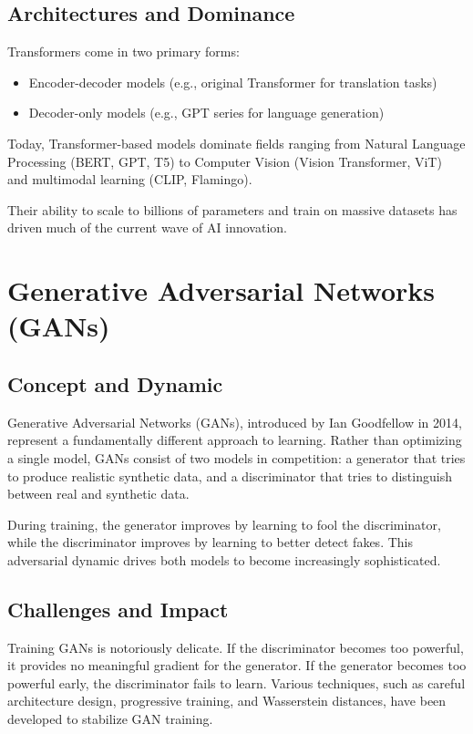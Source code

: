 \documentclass{book}
\begin{document}
\subsection{Architectures and Dominance}

Transformers come in two primary forms:

\begin{itemize}
    \item Encoder-decoder models (e.g., original Transformer for translation 
    tasks)
    \item Decoder-only models (e.g., GPT series for language generation)
\end{itemize}

Today, Transformer-based models dominate fields ranging from Natural Language 
Processing (BERT, GPT, T5) to Computer Vision (Vision Transformer, ViT) and 
multimodal learning (CLIP, Flamingo).

Their ability to scale to billions of parameters and train on massive datasets 
has driven much of the current wave of AI innovation.

\section{Generative Adversarial Networks (GANs)}

\subsection{Concept and Dynamic}

Generative Adversarial Networks (GANs), introduced by Ian Goodfellow in 2014, 
represent a fundamentally different approach to learning. Rather than optimizing 
a single model, GANs consist of two models in competition: a generator that 
tries to produce realistic synthetic data, and a discriminator that tries to 
distinguish between real and synthetic data.

During training, the generator improves by learning to fool the discriminator, 
while the discriminator improves by learning to better detect fakes. This 
adversarial dynamic drives both models to become increasingly sophisticated.

\subsection{Challenges and Impact}

Training GANs is notoriously delicate. If the discriminator becomes too 
powerful, it provides no meaningful gradient for the generator. If the generator 
becomes too powerful early, the discriminator fails to learn. Various 
techniques, such as careful architecture design, progressive training, and 
Wasserstein distances, have been developed to stabilize GAN training.
\end{document}
